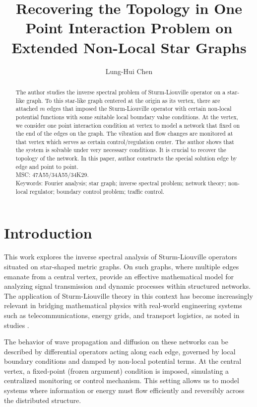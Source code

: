 \documentclass[10pt,a4paper]{article}
\theoremstyle{plain}
\theoremstyle{definition}
\theoremstyle{remark}
\numberwithin{equation}{section}
\begin{document}
\title{Recovering the Topology in One Point Interaction Problem on Extended Non-Local Star Graphs}
\author[1]{Lung-Hui Chen}
\maketitle
\begin{abstract}
The author studies the inverse spectral problem of Sturm-Liouville operator on a star-like graph. To this star-like graph centered at the origin as its vertex, there are attached $m$ edges that imposed the Sturm-Liouville operator with certain non-local potential functions with some suitable local boundary value conditions. At the vertex, we consider one point interaction condition at vertex to model a network that fixed on the end of the edges on the graph. The vibration and flow changes are monitored at that vertex which serves as certain control/regulation center. The author shows that the system is solvable under very necessary conditions. It is crucial to recover  the topology of the network. In this paper, author constructs the special solution edge by edge and point to point.
\\MSC: 47A55/34A55/34K29.
\\Keywords:  Fourier analysis; star graph; inverse spectral problem; network theory; non-local regulator; boundary control problem; traffic control.
\end{abstract}
\section{Introduction}
This work explores the inverse spectral analysis of Sturm-Liouville operators situated on star-shaped metric graphs. On such graphs, where multiple edges emanate from a central vertex, provide an effective mathematical model for analyzing signal transmission and dynamic processes within structured networks. The application of Sturm-Liouville theory in this context has become increasingly relevant in bridging mathematical physics with real-world engineering systems such as telecommunications, energy grids, and transport logistics, as noted in  studies \cite{Freiling,Kostrykin,Kuchment,Kurasov,Novikov,Pokornyi}.

The behavior of wave propagation and diffusion on these networks can be described by differential operators acting along each edge, governed by local boundary conditions and damped by non-local potential terms. At the central vertex, a fixed-point (frozen argument) condition is imposed, simulating a centralized monitoring or control mechanism. This setting allows us to model systems where information or energy must flow efficiently and reversibly across the distributed structure.
\end{document}

